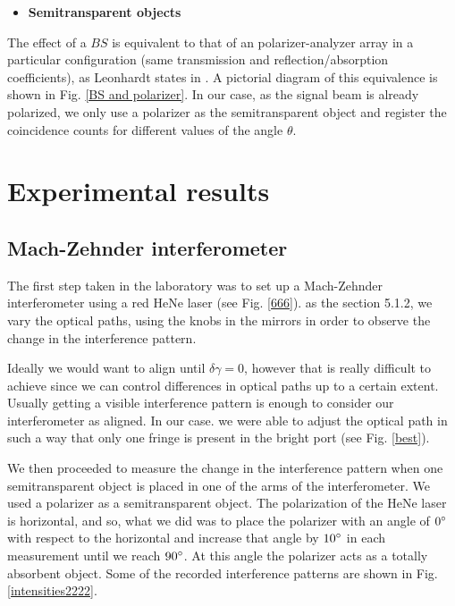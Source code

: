 \documentclass[12pt]{book}
\begin{document}
 \begin{itemize}
\item {\large \textbf{Semitransparent objects}}
\end{itemize}

The effect of a $BS$ is equivalent to that of an polarizer-analyzer array in a particular configuration (same transmission and reflection/absorption coefficients), as Leonhardt states in \cite{nosirve}. A pictorial diagram of this equivalence is shown in Fig. \ref{BS and polarizer}. In our case, as the signal beam is already polarized, we only use a polarizer as the semitransparent object and register the coincidence counts for different values of the angle $\theta$.







  
 \pagebreak
 

\chapter{Experimental results}

\section{Mach-Zehnder interferometer}

The first step taken in the laboratory was to set up a Mach-Zehnder interferometer using a red HeNe laser (see Fig. \ref{666}). as the section 5.1.2, we vary the optical paths, using the knobs in the mirrors in order to observe the change in the interference pattern.

Ideally we would want to align until $\delta \gamma=0$, however that is really difficult to achieve since we can control differences in optical paths up to a certain extent. Usually getting a visible interference pattern is enough to consider our interferometer as aligned. In our case. we were able to adjust the optical path in such a way that only one fringe is present in the bright port (see Fig. \ref{best}).


We then proceeded to measure the change in the interference pattern when one semitransparent object is placed in one of the arms of the interferometer. We used a polarizer as a semitransparent object. The polarization of the HeNe laser is horizontal, and so, what we did was to place the polarizer with an angle of $0\degree$ with respect to the horizontal and increase that angle by $10\degree$ in each measurement until we reach $90\degree$. At this angle the polarizer acts as a totally absorbent object. Some of the recorded interference patterns are shown in Fig. \ref{intensities2222}. 
\end{document}
